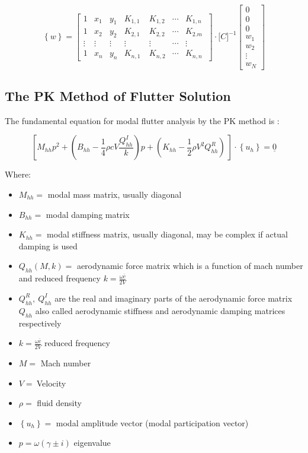 \begin{equation}
\left\{ w \right\} = \begin{bmatrix}
1 & x_{1} & y_{1} & K_{1,1} & K_{1,2} & \cdots & K_{1,n} \\
1 & x_{2} & y_{2} & K_{2,1} & K_{2,2} & \cdots & K_{2.m} \\
 \vdots & \vdots & \vdots & \vdots & \vdots & \cdots & \vdots \\
1 & x_{n} & y_{n} & K_{n,1}\  & K_{n,2} & \cdots & K_{n,n}\ 
\end{bmatrix} \cdot \lbrack C\rbrack^{- 1}\begin{bmatrix}
0 \\
0 \\
0 \\
w_{1} \\
w_{2} \\
 \vdots \\
w_{N}
\end{bmatrix}
\end{equation}

\subsection{The PK Method of Flutter Solution}
\label{the-pk-method-of-flutter-solution}

The fundamental equation for modal flutter analysis by the PK method is \cite{msc2021}:

\begin{equation}
\left\lbrack M_{hh}p^{2} + \left( B_{hh} - \frac{1}{4}\rho cV\frac{Q_{hh}^{I}}{k} \right)p + \left( K_{hh} - \frac{1}{2}\rho V^{2}Q_{hh}^{R} \right)\  \right\rbrack \cdot \left\{ u_{h} \right\} = \underline{0}
\end{equation}


Where:

\begin{itemize}
\item
  $M_{hh} =$ modal mass matrix, usually diagonal
\item
  $B_{hh} =$ modal damping matrix
\item
  $K_{hh} =$ modal stiffness matrix, usually diagonal, may be complex
  if actual damping is used
\item
  $Q_{hh}(M,k) =$ aerodynamic force matrix which is a function of mach
  number and reduced frequency $k = \frac{\omega\overline{c}}{2V}$
\item
  $Q_{hh}^{R},\ Q_{hh}^{I}$ are the real and imaginary parts of the
  aerodynamic force matrix $Q_{hh}$ also called aerodynamic stiffness
  and aerodynamic damping matrices respectively
\item
  $k = \frac{\omega\overline{c}}{2V}$ reduced frequency
\item
  $M =$ Mach number
\item
  $V = \ $Velocity
\item
  $\rho =$ fluid density
\item
  $\left\{ u_{h} \right\} =$ modal amplitude vector (modal
  participation vector)
\item
  $p = \omega(\gamma \pm i)$ eigenvalue
\end{itemize}


